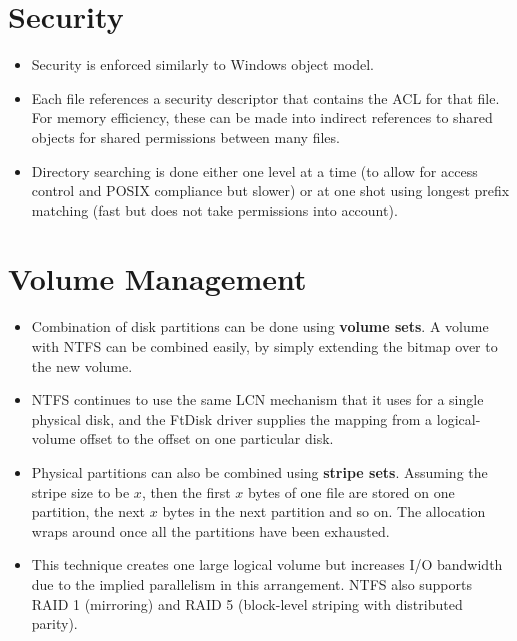 \documentclass{article}
\theoremstyle{plain}
\theoremstyle{definition}
\begin{document}
\section{Security}
\begin{itemize}
    \item Security is enforced similarly to Windows object model.
    
    \item Each file references a security descriptor that contains the ACL for that file. For memory efficiency, these can be made into indirect references to shared objects for shared permissions between many files. 
    
    \item Directory searching is done either one level at a time (to allow for access control and POSIX compliance but slower) or at one shot using longest prefix matching (fast but does not take permissions into account). 
\end{itemize}

\section{Volume Management}
\begin{itemize}
    \item Combination of disk partitions can be done using \textbf{volume sets}. A volume with NTFS can be combined easily, by simply extending the bitmap over to the new volume. 
    
    \item NTFS continues to use the same LCN mechanism that it uses for a single physical disk, and the FtDisk driver supplies the mapping from a logical-volume offset to the offset on one particular disk. 
    
    \item Physical partitions can also be combined using \textbf{stripe sets}. Assuming the stripe size to be $x$, then the first $x$ bytes of one file are stored on one partition, the next $x$ bytes in the next partition and so on. The allocation wraps around once all the partitions have been exhausted. 
    
    \item This technique creates one large logical volume but increases I/O bandwidth due to the implied parallelism in this arrangement. NTFS also supports RAID 1 (mirroring) and RAID 5 (block-level striping with distributed parity).
\end{itemize}
\end{document}
